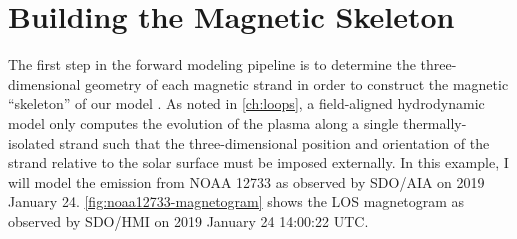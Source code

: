\section{Building the Magnetic Skeleton}


The first step in the forward modeling pipeline is to determine the three-dimensional geometry of each magnetic strand in order to construct the magnetic ``skeleton'' of our model \AR{}. As noted in \autoref{ch:loops}, a field-aligned hydrodynamic model only computes the evolution of the plasma along a single thermally-isolated strand such that the three-dimensional position and orientation of the strand relative to the solar surface must be imposed externally. In this example, I will model the emission from \AR{} NOAA 12733 as observed by SDO/AIA on 2019 January 24. \autoref{fig:noaa12733-magnetogram} shows the LOS magnetogram as observed by SDO/HMI on 2019 January 24 14:00:22 UTC.

